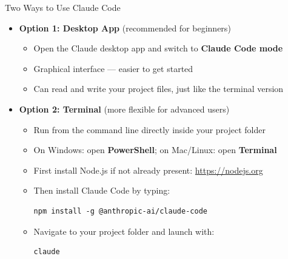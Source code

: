 \documentclass[hyperref={pdfpagelabels=false}]{beamer}
\begin{document}
\begin{frame}[fragile]{Two Ways to Use Claude Code}

\begin{itemize}
	\item \textbf{Option 1: Desktop App} \hfill {\small (recommended for beginners)}
	\vspace{0.1cm}
	\begin{itemize}
		\item Open the Claude desktop app and switch to \textbf{Claude Code mode}
		\vspace{0.1cm}
		\item Graphical interface --- easier to get started
		\vspace{0.1cm}
		\item Can read and write your project files, just like the terminal version
	\end{itemize}
	\vspace{0.35cm}
	\item \textbf{Option 2: Terminal} \hfill {\small (more flexible for advanced users)}
	\vspace{0.1cm}
	\begin{itemize}
		\item Run from the command line directly inside your project folder
		\vspace{0.1cm}
		\item On Windows: open \textbf{PowerShell}; on Mac/Linux: open \textbf{Terminal}
		\vspace{0.1cm}
		\item First install Node.js if not already present: \url{https://nodejs.org}
		\vspace{0.1cm}
		\item Then install Claude Code by typing:
\begin{lstlisting}[style=nonumbers, basicstyle=\small\ttfamily, frame=single]
npm install -g @anthropic-ai/claude-code
\end{lstlisting}
		\item Navigate to your project folder and launch with:
\begin{lstlisting}[style=nonumbers, basicstyle=\small\ttfamily, frame=single]
claude
\end{lstlisting}
	\end{itemize}
\end{itemize}

\end{frame}


\end{document}
